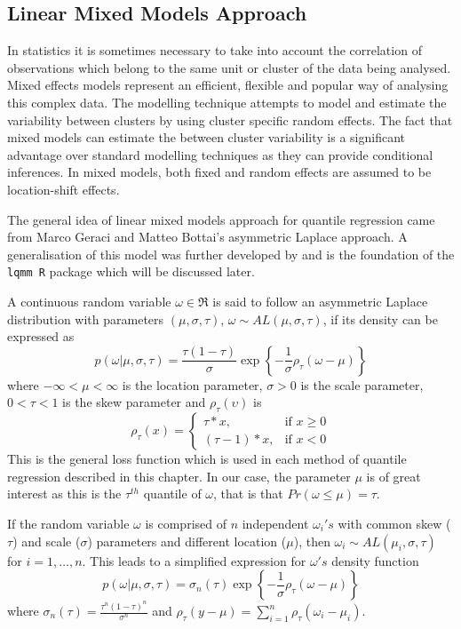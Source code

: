\documentclass[12pt,a4paper]{report}
\begin{document}
\subsection{Linear Mixed Models Approach}
In statistics it is sometimes necessary to take into account the correlation of observations which belong to the same unit or cluster of the data being analysed. Mixed effects models represent an efficient, flexible and popular way of analysing this complex data. The modelling technique attempts to model and estimate the variability between clusters by using cluster specific random effects. The fact that mixed models can estimate the between cluster variability is a significant advantage over standard modelling techniques as they can provide conditional inferences. In mixed models, both fixed and random effects are assumed to be location-shift effects.
\vspace{2mm}

The general idea of linear mixed models approach for quantile regression came from Marco Geraci and Matteo Bottai's asymmetric Laplace approach. A generalisation of this model was further developed by \citet{lqmm} and is the foundation of the {\small\verb"lqmm R"} package which will be discussed later.
\vspace{2mm}

A continuous random variable $\omega\in\Re$ is said to follow an asymmetric Laplace distribution with parameters $(\mu,\sigma,\tau)$, $\omega\sim AL(\mu,\sigma,\tau)$, if its density can be expressed as
$$ p(\omega|\mu,\sigma,\tau)=\frac{\tau(1-\tau)}{\sigma}\exp\left\{-\frac{1}{\sigma}\rho_{\tau}(\omega-\mu)\right\} $$
\vspace{1.5mm}
where $-\infty<\mu<\infty$ is the location parameter, $\sigma >0$ is the scale parameter, $0<\tau<1$ is the skew parameter and $\rho_{\tau}(\upsilon)$ is
    \[
        \rho_{\tau}(x)=
        \begin{cases}
        \tau*x,& \text{if } x\geq0\\
        (\tau-1)*x,& \text{if } x<0
        \end{cases}
    \]
This is the general loss function which is used in each method of quantile regression described in this chapter. In our case, the parameter $\mu$ is of great interest as this is the $\tau^{th}$ quantile of $\omega$, that is that $Pr(\omega\leq\mu)=\tau$.
\vspace{2mm}

If the random variable $\omega$ is comprised of $n$ independent $\omega_{i}'s$ with common skew ($\tau$) and scale ($\sigma$) parameters and different location ($\mu$), then $\omega_{i}\sim AL(\mu_{i},\sigma,\tau)$ for $i={1,\ldots,n}$. This leads to a simplified expression for $\omega's$ density function
$$p(\omega|\mu,\sigma,\tau)=\sigma_{n}(\tau)\exp\left\{-\frac{1}{\sigma}\rho_{\tau}(\omega-\mu)\right\} $$
where $\sigma_{n}(\tau)=\frac{\tau^{n}(1-\tau)^{n}}{\sigma^{n}}$ and $\rho_{\tau}(y-\mu)=\sum_{i=1}^{n}\rho_{\tau}(\omega_{i}-\mu_{i})$.
\vspace{2mm}
\end{document}
